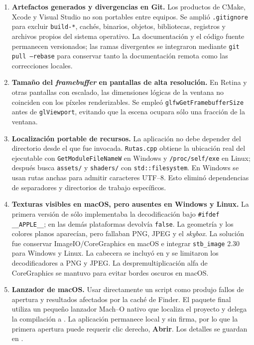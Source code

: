 \documentclass[letter,11pt]{article}
\begin{document}
	\begin{enumerate}[leftmargin=*]
		\item \textbf{Artefactos generados y divergencias en Git.}
		Los productos de CMake, Xcode y Visual Studio no son portables entre equipos. Se amplió \texttt{.gitignore} para excluir \texttt{build-*}, cachés, binarios, objetos, bibliotecas, registros y archivos propios del sistema operativo. La documentación y el código fuente permanecen versionados; las ramas divergentes se integraron mediante \texttt{git pull --rebase} para conservar tanto la documentación remota como las correcciones locales.

		\item \textbf{Tamaño del \textit{framebuffer} en pantallas de alta resolución.}
		En Retina y otras pantallas con escalado, las dimensiones lógicas de la ventana no coinciden con los píxeles renderizables. Se empleó \texttt{glfwGetFramebufferSize} antes de \texttt{glViewport}, evitando que la escena ocupara sólo una fracción de la ventana.

		\item \textbf{Localización portable de recursos.}
		La aplicación no debe depender del directorio desde el que fue invocada. \texttt{Rutas.cpp} obtiene la ubicación real del ejecutable con \texttt{GetModuleFileNameW} en Windows y \texttt{/proc/self/exe} en Linux; después busca \texttt{assets/} y \texttt{shaders/} con \texttt{std::filesystem}. En Windows se usan rutas anchas para admitir caracteres UTF--8. Esto eliminó dependencias de separadores y directorios de trabajo específicos.

		\item \textbf{Texturas visibles en macOS, pero ausentes en Windows y Linux.}
		La primera versión de  sólo implementaba la decodificación bajo \texttt{\#ifdef} \texttt{\_\_APPLE\_\_}; en las demás plataformas devolvía \texttt{false}. La geometría y los colores planos aparecían, pero fallaban PNG, JPEG y el \textit{skybox}. La solución fue conservar ImageIO/CoreGraphics en macOS e integrar \texttt{stb\_image} 2.30 para Windows y Linux. La cabecera se incluyó en  y se limitaron los decodificadores a PNG y JPEG. La despremultiplicación alfa de CoreGraphics se mantuvo para evitar bordes oscuros en macOS.

		\item \textbf{Lanzador de macOS.}
		Usar directamente un script como  produjo fallos de apertura y resultados afectados por la caché de Finder. El paquete final utiliza un pequeño lanzador Mach--O nativo que localiza el proyecto y delega la compilación a . La aplicación permanece local y sin firma, por lo que la primera apertura puede requerir clic derecho, \textbf{Abrir}. Los detalles se guardan en .


\end{enumerate}
\end{document}

